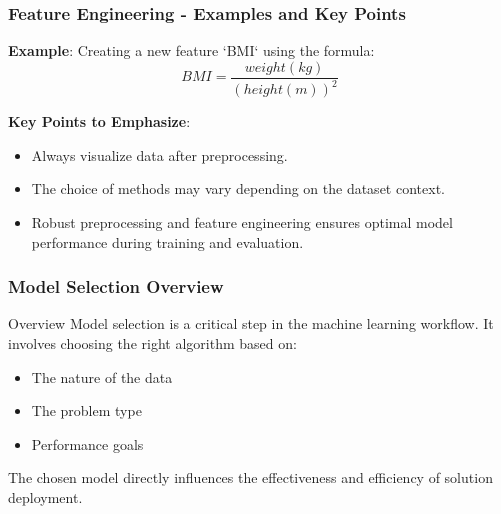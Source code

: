 \documentclass[aspectratio=169]{beamer}
\begin{document}
\begin{frame}[fragile]
    \frametitle{Feature Engineering - Examples and Key Points}
    \textbf{Example}: Creating a new feature `BMI` using the formula:
    \begin{equation}
    BMI = \frac{weight(kg)}{(height(m))^2}
    \end{equation}
    
    \vspace{1em}
    \textbf{Key Points to Emphasize}:
    \begin{itemize}
        \item Always visualize data after preprocessing.
        \item The choice of methods may vary depending on the dataset context.
        \item Robust preprocessing and feature engineering ensures optimal model performance during training and evaluation.
    \end{itemize}
\end{frame}

\begin{frame}[fragile]
    \frametitle{Model Selection Overview}
    \begin{block}{Overview}
        Model selection is a critical step in the machine learning workflow. It involves choosing the right algorithm based on:
        \begin{itemize}
            \item The nature of the data
            \item The problem type
            \item Performance goals
        \end{itemize}
        The chosen model directly influences the effectiveness and efficiency of solution deployment.
    \end{block}
\end{frame}
\end{document}
